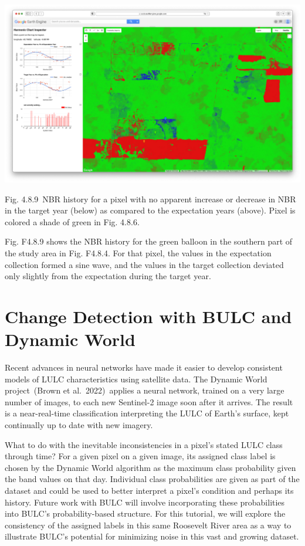 \documentclass[
  letterpaper,
  DIV=11,
  numbers=noendperiod]{scrreprt}
\begin{document}
\includegraphics{./F4/image56.png}

Fig. 4.8.9~NBR history for a pixel with no apparent increase or decrease
in NBR in the target year (below) as compared to the expectation years
(above). Pixel is colored a shade of green in Fig. 4.8.6.

Fig. F4.8.9 shows the NBR history for the green balloon in the southern
part of the study area in Fig. F4.8.4. For that pixel, the values in the
expectation collection formed a sine wave, and the values in the target
collection deviated only slightly from the expectation during the target
year.

\hypertarget{change-detection-with-bulc-and-dynamic-world}{%
\section{Change Detection with BULC and Dynamic
World}\label{change-detection-with-bulc-and-dynamic-world}}

Recent advances in neural networks have made it easier to develop
consistent models of LULC characteristics using satellite data. The
Dynamic World project~(Brown et al.~2022)~applies a neural network,
trained on a very large number of images, to each new Sentinel-2 image
soon after it arrives. The result is a near-real-time classification
interpreting the LULC of Earth's surface, kept continually up to date
with new imagery.

What to do with the inevitable inconsistencies in a pixel's stated LULC
class through time? For a given pixel on a given image, its assigned
class label is chosen by the Dynamic World algorithm as the maximum
class probability given the band values on that day. Individual class
probabilities are given as part of the dataset and could be used to
better interpret a pixel's condition and perhaps its history. Future
work with BULC will involve incorporating these probabilities into
BULC's probability-based structure. For this tutorial, we will explore
the consistency of the assigned labels in this same Roosevelt River area
as a way to illustrate BULC's potential for minimizing noise in this
vast and growing dataset.
\end{document}
